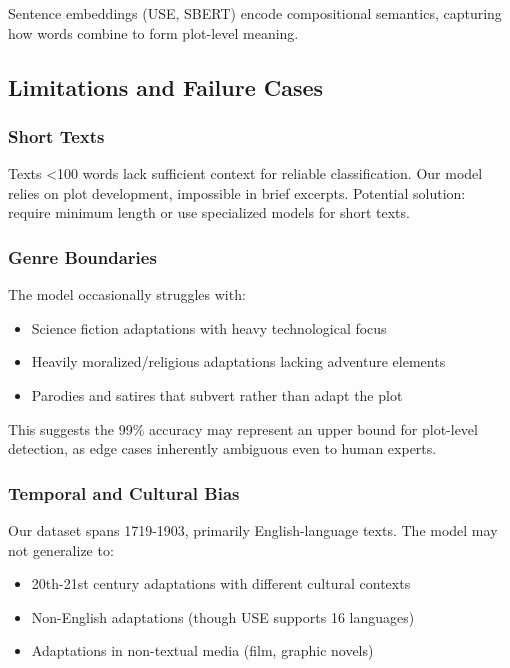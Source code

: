 \documentclass[12pt,a4paper]{article}
\begin{document}
Sentence embeddings (USE, SBERT) encode compositional semantics, capturing how words combine to form plot-level meaning.

\subsection{Limitations and Failure Cases}

\subsubsection{Short Texts}

Texts <100 words lack sufficient context for reliable classification. Our model relies on plot development, impossible in brief excerpts. Potential solution: require minimum length or use specialized models for short texts.

\subsubsection{Genre Boundaries}

The model occasionally struggles with:
\begin{itemize}
    \item Science fiction adaptations with heavy technological focus
    \item Heavily moralized/religious adaptations lacking adventure elements
    \item Parodies and satires that subvert rather than adapt the plot
\end{itemize}

This suggests the 99\% accuracy may represent an upper bound for plot-level detection, as edge cases inherently ambiguous even to human experts.

\subsubsection{Temporal and Cultural Bias}

Our dataset spans 1719-1903, primarily English-language texts. The model may not generalize to:
\begin{itemize}
    \item 20th-21st century adaptations with different cultural contexts
    \item Non-English adaptations (though USE supports 16 languages)
    \item Adaptations in non-textual media (film, graphic novels)
\end{itemize}
\end{document}
